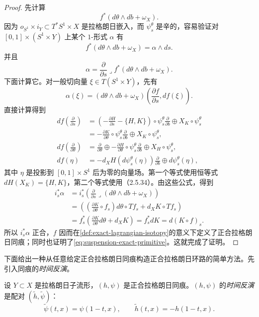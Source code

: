 \begin{proof}
先计算
\[
 f^*(d\theta\wedge db+\omega_X).
\]
因为 $o_{S^1}\times i_Y\subset T^*S^1\times X$ 是拉格朗日嵌入，而
$\psi_s^\theta$ 是辛的，容易验证对 $[0,1]\times(S^1\times Y)$ 上某个 $1$-形式 $\alpha$ 有
\[
 f^*(d\theta\wedge db+\omega_X)=\alpha\wedge ds.
\]
并且
\[
 \alpha=\frac\partial{\partial s}\mathbin{\lrcorner}
 f^*(d\theta\wedge db+\omega_X).
\]
下面计算它。对一般切向量 $\xi\in T(S^1\times Y)$，先有
\[
 \alpha(\xi)=(d\theta\wedge db+\omega_X)
 \left(\frac{\partial f}{\partial s},df(\xi)\right).
\]
直接计算得到
\[
\begin{aligned}
 df\left(\frac\partial{\partial s}\right)
 &=\left(-\frac{\partial H}{\partial s}-\{H,K\}\right)
      \circ\psi_s^\theta\frac\partial{\partial b}
      \oplus X_K\circ\psi_s^\theta\\
 &=-\frac{\partial K}{\partial\theta}\circ\psi_s^\theta
      \frac\partial{\partial b}\oplus X_K\circ\psi_s^\theta,\\
 df\left(\frac\partial{\partial\theta}\right)
 &=\frac\partial{\partial\theta}\oplus
   -\frac{\partial H}{\partial\theta}\circ\psi_s^\theta
       \frac\partial{\partial b}\oplus X_H\circ\psi_s^\theta,\\
 df(\eta)
 &=-d_XH(d\psi_s^\theta(\eta))\frac\partial{\partial b}
      \oplus d\psi_s^\theta(\eta),
\end{aligned}
\]
其中 $\eta$ 是投影到 $[0,1]\times S^1$ 后为零的向量场。第一个等式使用恒等式
$dH(X_K)=\{H,K\}$，第二个等式使用（2.5.34）。由这些公式，得到
\[
\begin{aligned}
 i_s^*\alpha
 &=i_s^*\left(\frac\partial{\partial s}\mathbin{\lrcorner}
      (d\theta\wedge db+\omega_X)\right)\\
 &=\left(\left(\frac{\partial K}{\partial\theta}\circ f_s\right)
      d\theta\circ Tf_s+d_XK\circ Tf_s\right)\\
 &=f_s^*\left(\frac{\partial K}{\partial\theta}d\theta+d_XK\right)
 =f_s^*dK=d(K\circ f)_s.
\end{aligned}
\]
所以 $i_s^*\alpha$ 正合，$f$ 因而在\cref{def:exact-lagrangian-isotopy}的意义下定义了正合拉格朗日同痕；同时也证明了\eqref{eq:suspension-exact-primitive}。这就完成了证明。
\end{proof}

下面给出一种从任意给定正合拉格朗日同痕构造正合拉格朗日环路的简单方法。先引入同痕的\emph{时间反演}。

\begin{definition}\label{def:isotopy-time-reversal}
设 $Y\subset X$ 是拉格朗日子流形，$(h,\psi)$ 是正合拉格朗日同痕。$(h,\psi)$ 的\emph{时间反演}是配对 $(\widetilde h,\widetilde\psi)$：
\[
 \widetilde\psi(t,x)=\psi(1-t,x),
 \qquad
 \widetilde h(t,x)=-h(1-t,x).
\]
\end{definition}

